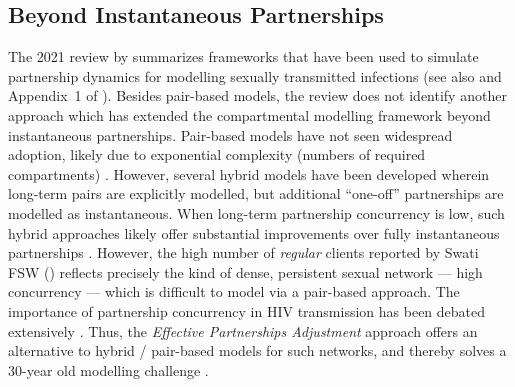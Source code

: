 \subsection{Beyond Instantaneous Partnerships}\label{foi.disc.bip}
The 2021 review by \citet{Rao2021} summarizes frameworks that have been used to
simulate partnership dynamics for modelling sexually transmitted infections
(see also  and Appendix~1 of \cite{Johnson2016mf}).
Besides pair-based models, the review does not identify another approach
which has extended the compartmental modelling framework beyond instantaneous partnerships.
Pair-based models have not seen widespread adoption, likely due to
exponential complexity (\ie numbers of required compartments) \cite{Kretzschmar2017}.
However, several hybrid models have been developed \cite{Xiridou2003,Powers2011}
wherein long-term pairs are explicitly modelled,
but additional ``one-off'' partnerships are modelled as instantaneous.
When long-term partnership concurrency is low, such hybrid approaches
likely offer substantial improvements over fully instantaneous partnerships
\cite{Kretzschmar1998,Eames2002,Lloyd-Smith2004}.
However, the high number of \emph{regular} clients reported by Swati FSW ()
reflects precisely the kind of dense, persistent sexual network  --- \ie high concurrency ---
which is difficult to model via a pair-based approach.
The importance of partnership concurrency in HIV transmission has been debated extensively
\cite{Mah2010,Tanser2011,Goodreau2012,Boily2012,Sawers2013}.
Thus, the \emph{Effective Partnerships Adjustment} approach offers
an alternative to hybrid / pair-based models for such networks,
and thereby solves a 30-year old modelling challenge \cite{Dietz1988a}.
